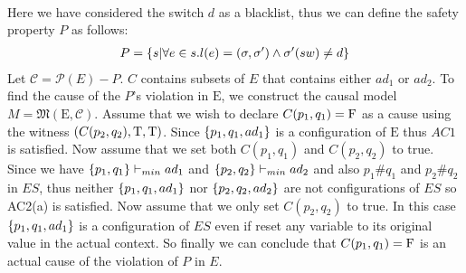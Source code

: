 \begin{example}
\begin{align*}
    \end{align*}
    Here we have considered the switch $d$ as a blacklist, thus we can define the
    safety property $P$ as follows:
    \begin{align*}
        P = \{s|\forall e \in s. l(e) = (\sigma,\sigma')\wedge \sigma'(sw) \neq d\}
    \end{align*}
    Let $\mathcal{C} = \mathcal{P}(E) - P$.
    $C$ contains subsets of $E$ that contains either $ad_1$ or $ad_2$.
    To find the cause of the $P$'s violation in $\mathrm{E}$, we construct the
    causal model $M = \mathfrak{M}(\mathrm{E},\mathcal{C})$.
    Assume that we wish to declare $C(p_1,q_1) = \mathrm{F}$ as a cause using the witness
    $(C(p_2,q_2),\mathrm{T},\mathrm{T})$.
    Since $\{p_1,q_1,ad_1\}$ is a configuration of $\mathrm{E}$ thus
    $AC1$ is satisfied.
    Now assume that we set both $C(p_1,q_1)$ and $C(p_2,q_2)$ to true.
    Since we have $\{p_1,q_1\} \vdash_{min} ad_1$ and
    $\{p_2,q_2\} \vdash_{min} ad_2$ and also $p_1\#q_1$ and $p_2\#q_2$ in $ES$,
    thus neither $\{p_1,q_1,ad_1\}$ nor $\{p_2,q_2,ad_2\}$ are not
    configurations of $ES$ so AC2(a) is satisfied.
    Now assume that we only set $C(p_2,q_2)$ to true.
    In this case $\{p_1,q_1,ad_1\}$ is a configuration of $ES$ even if reset any
    variable to its original value in the actual context.
    So finally we can conclude that $C(p_1,q_1) = \mathrm{F}$ is an actual cause of the
    violation of $P$ in $E$.
\end{example}